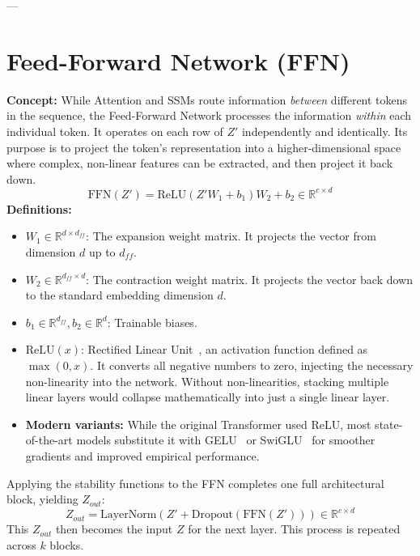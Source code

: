 \documentclass[11pt]{article}
\begin{document}
	---
	
	\section{Feed-Forward Network (FFN)}
	\textbf{Concept:} While Attention and SSMs route information \textit{between} different tokens in the sequence, the Feed-Forward Network processes the information \textit{within} each individual token.
	It operates on each row of $Z'$ independently and identically.
	Its purpose is to project the token's representation into a higher-dimensional space where complex, non-linear features can be extracted, and then project it back down.
	\begin{equation}
		\text{FFN}(Z') = \text{ReLU}(Z' W_1 + b_1) W_2 + b_2 \in \mathbb{R}^{c \times d}
	\end{equation}
	\textbf{Definitions:}
	\begin{itemize}
		\item $W_1 \in \mathbb{R}^{d \times d_{ff}}$: The expansion weight matrix.
		It projects the vector from dimension $d$ up to $d_{ff}$.
		\item $W_2 \in \mathbb{R}^{d_{ff} \times d}$: The contraction weight matrix.
		It projects the vector back down to the standard embedding dimension $d$.
		\item $b_1 \in \mathbb{R}^{d_{ff}}, b_2 \in \mathbb{R}^d$: Trainable biases.
		\item $\text{ReLU}(x)$: Rectified Linear Unit~\cite{nair2010relu}, an activation function defined as $\max(0, x)$.
		It converts all negative numbers to zero, injecting the necessary non-linearity into the network.
		Without non-linearities, stacking multiple linear layers would collapse mathematically into just a single linear layer.
		\item \textbf{Modern variants:} While the original Transformer used ReLU, most state-of-the-art models substitute it with GELU~\cite{hendrycks2016gelu} or SwiGLU~\cite{shazeer2020glu} for smoother gradients and improved empirical performance.
	\end{itemize}
	
	Applying the stability functions to the FFN completes one full architectural block, yielding $Z_{out}$:
	\begin{equation}
		Z_{out} = \text{LayerNorm}(Z' + \text{Dropout}(\text{FFN}(Z'))) \in \mathbb{R}^{c \times d}
	\end{equation}
	This $Z_{out}$ then becomes the input $Z$ for the next layer.
	This process is repeated across $k$ blocks.
	
\end{document}
